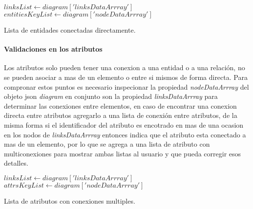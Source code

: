 \begin{algorithm}[H]

  $linksList \gets diagram['linksDataArrray']$\\
  $entitiesKeyList \gets diagram['nodeDataArrray']$\\
  
  \caption{Lista de entidades conectadas directamente.}
\end{algorithm}

\paragraph*{Validaciones en los atributos}

Los atributos solo pueden tener una conexion a una entidad o a una relación, no se pueden asociar a mas de un elemento o entre si mismos de forma directa. Para compronar estos puntos es necesario inspecionar la propiedad \textit{nodeDataArrray} del objeto json \textit{diagram} en conjunto son la propiedad \textit{linksDataArrray} para determinar las conexiones entre elementos, en caso de encontrar una conexion directa entre atributos agregarlo a una lista de conexión entre atributos, de la misma forma si el identificador del atributo es encotrado en mas de una ocasion en los nodos de \textit{linksDataArrray} entonces indica que el atributo esta conectado a mas de un elemento, por lo que se agrega a una lista de atributo con multiconexiones para mostrar ambas listas al usuario y que pueda corregir esos detalles.

\begin{algorithm}[H]

  $linksList \gets diagram['linksDataArrray']$\\
  $attrsKeyList \gets diagram['nodeDataArrray']$\\

  \caption{Lista de atributos con conexiones multiples.}
\end{algorithm}

